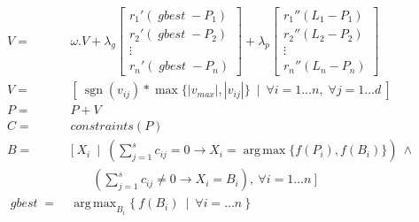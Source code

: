 \documentclass[10pt]{article}
\DeclareMathOperator*{\argmax}{arg\,max}
\DeclareMathOperator*{\sgn}{sgn}
\DeclareMathOperator*{\gbest}{\mathit{gbest}}
\begin{document}
\begin{appendices}
  \begin{align*}
    V  =&\ \omega.V + \lambda_g\begin{bmatrix}
      {r_1}'(\gbest - P_1)\\
      {r_2}'(\gbest - P_2)\\
      \vdots\\
      {r_n}'(\gbest - P_n)
    \end{bmatrix} + \lambda_p\begin{bmatrix}
      {r_1}''(L_1 - P_1)\\
      {r_2}''(L_2 - P_2)\\
      \vdots\\
      {r_n}''(L_n - P_n)
    \end{bmatrix}\\
    V  =&\ \left[\ \sgn(v_{ij})*\max\{|v_{max}|,|v_{ij}|\}\ \mid\ \forall i=1\dots n,\;\forall j=1\dots d\ \right]\\
    P  =&\ P + V\\
    C  =&\ \mathit{constraints}(P)\\
    B  =&\ [\ X_i\ \mid\ (\textstyle\sum_{j=1}^s c_{ij} = 0 \to X_i = \argmax\{f(P_i), f(B_i)\})\ \wedge\\
        &\qquad(\textstyle\sum_{j=1}^s c_{ij} \neq 0 \to X_i = B_i),\ \forall i=1\dots n\ ]\\
    \gbest =&\ \argmax_{{B}_i} \{\ {f(B_i)}\ \mid\ \forall i=\dots n\ \}
  \end{align*}

\end{appendices}
\end{document}
